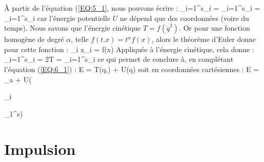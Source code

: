 \`A partir de l'\'equation (\ref{EQ:5_1}, nous pouvons \'ecrire :
\benn
	\sum_{i=1}^{s}_{i} = \sum_{i=1}^{s}_{i} = \sum_{i=1}^{s}_{i}
\eenn
car l'\'energie potentielle $U$ ne d\'epend que des coordonn\'ees (voire du temps).
Nous savons que l'\'energie cin\'etique $T = f(\dot{q}^{2})$. Or pour une fonction homog\`ene de degr\'e $\alpha$, telle $f(t.x) = t^{\alpha}f(x)$, alors le th\'eor\`eme d'Euler donne pour cette fonction :
\benn
	\sum_{i} x_{i} = \alpha f(x)
\eenn
Appliqu\'ee \`a l'\'energie cin\'etique, cela donne :
\be
	\sum_{i=1}^{s}_{i} = 2T = \sum_{i=1}^{s}_{i} \label{EQ:6_1_1}
\ee
ce qui permet de conclure \`a, en compl\'etant l'\'equation (\ref{EQ:6_1}) :
\be
	E = T(q,) + U(q) \label{EQ:6_2}
\ee
soit en coordonn\'ees cart\'esiennes :
\be
	E = \sum_{a} + U(\begin{Bmatrix}_{i}\end{Bmatrix}_{1}^{s}) \label{EQ:6_3}
\ee

\section{Impulsion}

